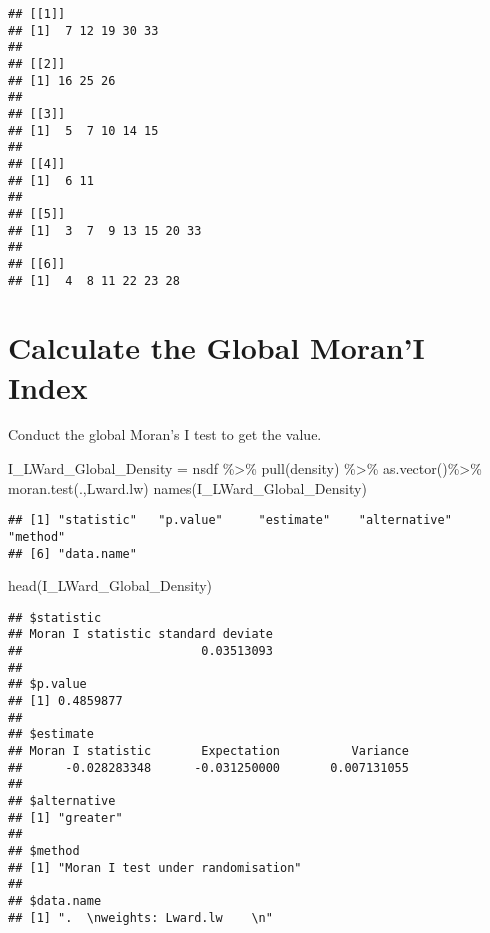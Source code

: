 \documentclass[
]{book}
\newenvironment{Shaded}{\begin{snugshade}}{\end{snugshade}}
\newcommand{\AttributeTok}[1]{\textcolor[rgb]{0.77,0.63,0.00}{#1}}
\newcommand{\FunctionTok}[1]{\textcolor[rgb]{0.00,0.00,0.00}{#1}}
\newcommand{\NormalTok}[1]{#1}
\newcommand{\OtherTok}[1]{\textcolor[rgb]{0.56,0.35,0.01}{#1}}
\newcommand{\SpecialCharTok}[1]{\textcolor[rgb]{0.00,0.00,0.00}{#1}}
\newcommand{\StringTok}[1]{\textcolor[rgb]{0.31,0.60,0.02}{#1}}
\begin{document}
\begin{Shaded}
\end{Shaded}

\begin{verbatim}
## [[1]]
## [1]  7 12 19 30 33
## 
## [[2]]
## [1] 16 25 26
## 
## [[3]]
## [1]  5  7 10 14 15
## 
## [[4]]
## [1]  6 11
## 
## [[5]]
## [1]  3  7  9 13 15 20 33
## 
## [[6]]
## [1]  4  8 11 22 23 28
\end{verbatim}

\hypertarget{calculate-the-global-morani-index}{%
\section{Calculate the Global Moran'I Index}\label{calculate-the-global-morani-index}}

Conduct the global Moran's I test to get the value.

\begin{Shaded}
\begin{Highlighting}[]
\NormalTok{ I\_LWard\_Global\_Density }\OtherTok{=}\NormalTok{ nsdf }\SpecialCharTok{\%\textgreater{}\%}
   \FunctionTok{pull}\NormalTok{(density) }\SpecialCharTok{\%\textgreater{}\%}
   \FunctionTok{as.vector}\NormalTok{()}\SpecialCharTok{\%\textgreater{}\%}
   \FunctionTok{moran.test}\NormalTok{(.,Lward.lw)}
\FunctionTok{names}\NormalTok{(I\_LWard\_Global\_Density)}
\end{Highlighting}
\end{Shaded}

\begin{verbatim}
## [1] "statistic"   "p.value"     "estimate"    "alternative" "method"     
## [6] "data.name"
\end{verbatim}

\begin{Shaded}
\begin{Highlighting}[]
\FunctionTok{head}\NormalTok{(I\_LWard\_Global\_Density)}
\end{Highlighting}
\end{Shaded}

\begin{verbatim}
## $statistic
## Moran I statistic standard deviate 
##                         0.03513093 
## 
## $p.value
## [1] 0.4859877
## 
## $estimate
## Moran I statistic       Expectation          Variance 
##      -0.028283348      -0.031250000       0.007131055 
## 
## $alternative
## [1] "greater"
## 
## $method
## [1] "Moran I test under randomisation"
## 
## $data.name
## [1] ".  \nweights: Lward.lw    \n"
\end{verbatim}
\end{document}
